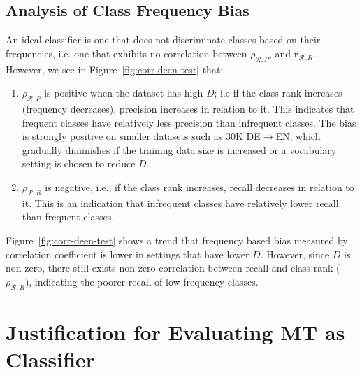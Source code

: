 \subsection{Analysis of Class Frequency Bias}
An ideal classifier is one that does not discriminate classes based on their frequencies, i.e. one that exhibits no correlation between $\rho_{\mathcal{R}, P}$, and $\mathbf{r}_{\mathcal{R}, R}$.
However, we see in Figure~\ref{fig:corr-deen-test} that:
\begin{enumerate}
    \itemsep0em
    \item $\rho_{\mathcal{R}, P}$ is positive when the dataset has high $D$; i.e if the class rank increases (frequency decreases), precision increases in relation to it.
    This indicates that frequent classes have relatively less precision than infrequent classes.
    The bias is strongly positive on smaller datasets such as 30K DE$\rightarrow$EN, which gradually diminishes if the training data size is increased or a vocabulary setting is chosen to reduce $D$.
    \item $\rho_{\mathcal{R}, R}$ is negative, i.e., if the class rank increases, recall decreases in relation to it.
    This is an indication that infrequent classes have relatively lower recall than frequent classes.
\end{enumerate}
Figure~\ref{fig:corr-deen-test} shows a trend that frequency based bias measured by correlation coefficient is lower in settings that have lower $D$.
However, since $D$ is non-zero, there still exists non-zero correlation between recall and class rank ($\rho_{\mathcal{R}, R}$), indicating the poorer recall of low-frequency classes.



\section{Justification for Evaluating MT as Classifier}
\label{sec:justific-mt-eval}

